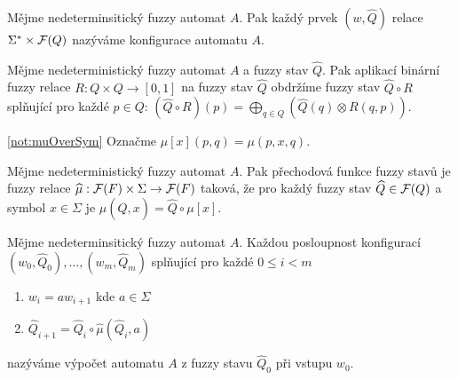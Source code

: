 \documentclass[a4paper,10pt]{article}
\begin{document}
\begin{definition}
  Mějme nedeterminsitický fuzzy automat $A$. Pak každý prvek $(w, \widehat{Q})$ relace $\Sigma^* \times \mathcal{F}(Q)$ nazýváme konfigurace automatu $A$.
\end{definition}


\begin{definition}
 Mějme nedeterministický fuzzy automat $A$ a fuzzy stav $\widehat{Q}$. Pak aplikací binární fuzzy relace $R: Q \times Q \rightarrow [0, 1]$ na fuzzy stav $\widehat{Q}$ obdržíme fuzzy stav $\widehat{Q} \circ R$ splňující pro každé $p \in Q$: $(\widehat{Q} \circ R )(p) = \bigoplus_{q \in Q} (\widehat{Q}(q) \otimes R(q, p))$.
 
\end{definition}

\begin{notation} \ref{not:muOverSym}
 Označme $\mu[x](p, q) = \mu(p, x, q)$.
\end{notation}

\begin{definition}\label{def-PreFunFuzzStav}
 Mějme nedeterministický fuzzy automat $A$. Pak přechodová funkce fuzzy stavů je fuzzy relace $\widehat{\mu}: \mathcal{F}(F) \times \Sigma \rightarrow \mathcal{F}(F)$ taková, že pro každý fuzzy stav $\widehat{Q} \in \mathcal{F}(Q)$ a symbol $x \in \Sigma$ je $\widehat{\mu}(\widehat{Q}, x) = \widehat{Q} \circ \mu[x]$.
\end{definition}

\begin{definition}
  Mějme nedeterminsitický fuzzy automat $A$. Každou posloupnost konfigurací $(w_0, \widehat{Q}_0), \dots, (w_m, \widehat{Q}_m)$ splňující pro každé $0 \leq i < m$
  \begin{enumerate}
   \item $w_{i} = a w_{i+1}$ kde $a \in \Sigma$
   \item $\widehat{Q}_{i+1} = \widehat{Q}_{i} \circ \widehat{\mu}(\widehat{Q}_{i}, a)$
  \end{enumerate}
  nazýváme výpočet automatu $A$ z fuzzy stavu $\widehat{Q}_0$ při vstupu $w_0$.
\end{definition}
\end{document}
